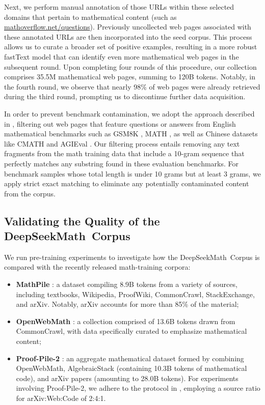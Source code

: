 \begin{itemize}[topsep=0pt]
Next, we perform manual annotation of those URLs within these selected domains that pertain to mathematical content (such as \url{mathoverflow.net/questions}). Previously uncollected web pages associated with these annotated URLs are then incorporated into the seed corpus. This process allows us to curate a broader set of positive examples, resulting in a more robust fastText model that can identify even more mathematical web pages in the subsequent round. Upon completing four rounds of this procedure, our collection comprises 35.5M mathematical web pages, summing to 120B tokens. Notably, in the fourth round, we observe that nearly 98\% of web pages were already retrieved during the third round, prompting us to discontinue further data acquisition.

In order to prevent benchmark contamination, we adopt the approach described in \cite{deepseek-coder}, filtering out web pages that feature questions or answers from English mathematical benchmarks such as GSM8K \citep{gsm8k}, MATH \citep{MATH}, as well as Chinese datasets like CMATH \citep{wei2023cmath} and AGIEval \citep{agieval}. Our filtering process entails removing any text fragments from the math training data that include a 10-gram sequence that perfectly matches any substring found in these evaluation benchmarks. For benchmark samples whose total length is under 10 grams but at least 3 grams, we apply strict exact matching to eliminate any potentially contaminated content from the corpus.

\subsection{Validating the Quality of the DeepSeekMath~Corpus}

We run pre-training experiments to investigate how the DeepSeekMath~Corpus is compared with the recently released math-training corpora:

\begin{itemize}[topsep=0pt]
    \item \textbf{MathPile} \citep{mathpile}: a dataset compiling 8.9B tokens from a variety of sources, including textbooks, Wikipedia, ProofWiki, CommonCrawl, StackExchange, and arXiv. Notably, arXiv accounts for more than 85\% of the material;
    \item \textbf{OpenWebMath} \citep{openwebmath}: a collection comprised of 13.6B tokens drawn from CommonCrawl, with data specifically curated to emphasize mathematical content;
    \item \textbf{Proof-Pile-2} \citep{llemma}: an aggregate mathematical dataset formed by combining OpenWebMath, AlgebraicStack (containing 10.3B tokens of mathematical code), and arXiv papers (amounting to 28.0B tokens). For experiments involving Proof-Pile-2, we adhere to the protocol in \cite{llemma}, employing a source ratio for arXiv:Web:Code of 2:4:1.
\end{itemize}


\end{itemize}
